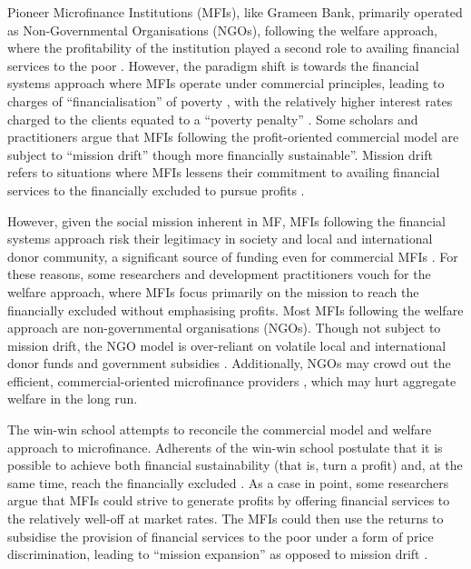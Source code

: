 \documentclass[a4paper, nobind]{templates/ociamthesis}
\begin{document}
Pioneer Microfinance Institutions (MFIs), like Grameen Bank, primarily operated as Non-Governmental Organisations (NGOs), following the welfare approach, where the profitability of the institution played a second role to availing financial services to the poor \autocite{chahine2010social,d2017ngos}. However, the paradigm shift is towards the financial systems approach where MFIs operate under commercial principles, leading to charges of ``financialisation'' of poverty \autocite{mader2015financialization}, with the relatively higher interest rates charged to the clients equated to a ``poverty penalty'' \autocite{chen2017microfinance}. Some scholars and practitioners argue that MFIs following the profit-oriented commercial model are subject to ``mission drift'' though more financially sustainable''. Mission drift refers to situations where MFIs lessens their commitment to availing financial services to the financially excluded to pursue profits \autocite{jia2016commercialization,mia2017mission}.

However, given the social mission inherent in MF, MFIs following the financial systems approach risk their legitimacy in society and local and international donor community, a significant source of funding even for commercial MFIs \autocite{nason2018behavioral}. For these reasons, some researchers and development practitioners vouch for the welfare approach, where MFIs focus primarily on the mission to reach the financially excluded without emphasising profits. Most MFIs following the welfare approach are non-governmental organisations (NGOs). Though not subject to mission drift, the NGO model is over-reliant on volatile local and international donor funds and government subsidies \autocite{garmaise2013cheap,d2017aid}. Additionally, NGOs may crowd out the efficient, commercial-oriented microfinance providers \autocite{kota2007microfinance}, which may hurt aggregate welfare in the long run.

The win-win school attempts to reconcile the commercial model and welfare approach to microfinance. Adherents of the win-win school postulate that it is possible to achieve both financial sustainability (that is, turn a profit) and, at the same time, reach the financially excluded \autocite{kodongo2013individual}. As a case in point, some researchers argue that MFIs could strive to generate profits by offering financial services to the relatively well-off at market rates. The MFIs could then use the returns to subsidise the provision of financial services to the poor under a form of price discrimination, leading to ``mission expansion'' as opposed to mission drift \autocite{mersland2010microfinance}.
\end{document}
